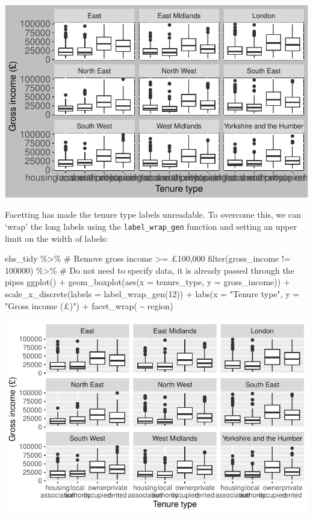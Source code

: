 \documentclass[
  letterpaper,
  DIV=11,
  numbers=noendperiod]{scrreprt}
\newenvironment{Shaded}{\begin{snugshade}}{\end{snugshade}}
\newcommand{\AttributeTok}[1]{\textcolor[rgb]{0.40,0.45,0.13}{#1}}
\newcommand{\CommentTok}[1]{\textcolor[rgb]{0.37,0.37,0.37}{#1}}
\newcommand{\DecValTok}[1]{\textcolor[rgb]{0.68,0.00,0.00}{#1}}
\newcommand{\FunctionTok}[1]{\textcolor[rgb]{0.28,0.35,0.67}{#1}}
\newcommand{\NormalTok}[1]{\textcolor[rgb]{0.00,0.23,0.31}{#1}}
\newcommand{\SpecialCharTok}[1]{\textcolor[rgb]{0.37,0.37,0.37}{#1}}
\newcommand{\StringTok}[1]{\textcolor[rgb]{0.13,0.47,0.30}{#1}}
\begin{document}
\includegraphics{visualisation_files/figure-pdf/boxplot income tenure region-1.pdf}

Facetting has made the tenure type labels unreadable. To overcome this,
we can `wrap' the long labels using the \texttt{label\_wrap\_gen}
function and setting an upper limit on the width of labels:

\begin{Shaded}
\begin{Highlighting}[]
\NormalTok{ehs\_tidy }\SpecialCharTok{\%\textgreater{}\%} 
  \CommentTok{\# Remove gross income \textgreater{}= £100,000}
  \FunctionTok{filter}\NormalTok{(gross\_income }\SpecialCharTok{!=} \DecValTok{100000}\NormalTok{) }\SpecialCharTok{\%\textgreater{}\%} 
  \CommentTok{\# Do not need to specify data, it is already passed through the pipes}
  \FunctionTok{ggplot}\NormalTok{() }\SpecialCharTok{+}
  \FunctionTok{geom\_boxplot}\NormalTok{(}\FunctionTok{aes}\NormalTok{(}\AttributeTok{x =}\NormalTok{ tenure\_type, }\AttributeTok{y =}\NormalTok{ gross\_income)) }\SpecialCharTok{+}
  \FunctionTok{scale\_x\_discrete}\NormalTok{(}\AttributeTok{labels =} \FunctionTok{label\_wrap\_gen}\NormalTok{(}\DecValTok{12}\NormalTok{)) }\SpecialCharTok{+}
  \FunctionTok{labs}\NormalTok{(}\AttributeTok{x =} \StringTok{"Tenure type"}\NormalTok{, }\AttributeTok{y =} \StringTok{"Gross income (£)"}\NormalTok{) }\SpecialCharTok{+}
  \FunctionTok{facet\_wrap}\NormalTok{( }\SpecialCharTok{\textasciitilde{}}\NormalTok{ region) }
\end{Highlighting}
\end{Shaded}

\includegraphics{visualisation_files/figure-pdf/boxplot income tenure region cleaner-1.pdf}
\end{document}
